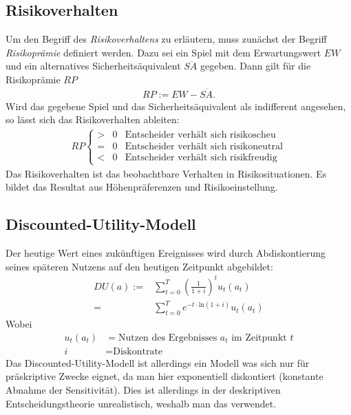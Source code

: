 \documentclass{panikzettel}
\begin{document}
\subsection{Risikoverhalten}
Um den Begriff des \textit{Risikoverhaltens} zu erläutern, muss zunächst der Begriff \textit{Risikoprämie} definiert werden. Dazu sei ein Spiel mit dem Erwartungswert $ EW $ und ein alternatives Sicherheitsäquivalent $ S\ddot{A} $ gegeben. Dann gilt für die Risikoprämie $ RP $
\begin{align*}
	RP := EW - S\ddot{A}.
\end{align*}
Wird das gegebene Spiel und das Sicherheitsäquivalent als indifferent angesehen, so lässt sich das Risikoverhalten ableiten:
\begin{align*}
	RP \left\lbrace \begin{array}{ccl}
	> & 0 & \text{Entscheider verhält sich risikoscheu}\\
	= & 0 & \text{Entscheider verhält sich risikoneutral}\\
	< & 0 & \text{Entscheider verhält sich risikfreudig}
	\end{array}\right.
\end{align*}
Das Risikoverhalten ist das beobachtbare Verhalten in Risikosituationen. Es bildet das Resultat aus Höhenpräferenzen und Risikoeinstellung.

\subsection{Discounted-Utility-Modell} \label{sec:du}
Der heutige Wert eines zukünftigen Ereignisses wird durch Abdiskontierung seines späteren Nutzens auf den heutigen Zeitpunkt abgebildet:
\begin{align*}
	DU(a) :=& \sum_{t=0}^{T} \left(\frac{1}{1+i}\right)^t u_t(a_t) \\
	=& \sum_{t=0}^{T} e^{-t\cdot \text{ln}(1+i)} u_t(a_t)
\end{align*}
Wobei
\begin{align*}
	u_t(a_t) &= \text{Nutzen des Ergebnisses } a_t \text{ im Zeitpunkt } t\\
	i &= \text{Diskontrate}
\end{align*}
Das Discounted-Utility-Modell ist allerdings ein Modell was sich nur für präskriptive Zwecke eignet, da man hier exponentiell diskontiert (konstante Abnahme der Sensitivität). Dies ist allerdings in der deskriptiven Entscheidungstheorie unrealistisch, weshalb man das  verwendet.
\end{document}
